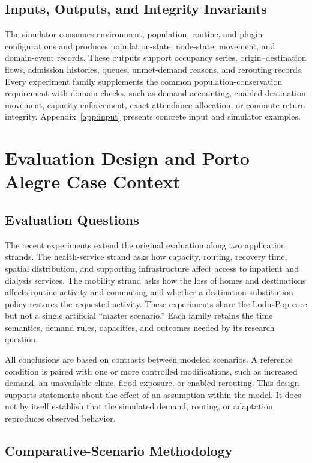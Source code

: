 \documentclass[pdflatex,sn-mathphys-num]{sn-jnl}%
\theoremstyle{thmstyleone}%
\theoremstyle{thmstyletwo}%
\theoremstyle{thmstylethree}%
\begin{document}
\subsection{Inputs, Outputs, and Integrity Invariants}

The simulator consumes environment, population, routine, and plugin configurations and produces population-state, node-state, movement, and domain-event records. These outputs support occupancy series, origin--destination flows, admission histories, queues, unmet-demand reasons, and rerouting records. Every experiment family supplements the common population-conservation requirement with domain checks, such as demand accounting, enabled-destination movement, capacity enforcement, exact attendance allocation, or commute-return integrity. Appendix~\ref{app:input} presents concrete input and simulator examples.

\section{Evaluation Design and Porto Alegre Case Context}
\label{sec:extended_evaluation}

\subsection{Evaluation Questions}
The recent experiments extend the original evaluation along two application strands. The health-service strand asks how capacity, routing, recovery time, spatial distribution, and supporting infrastructure affect access to inpatient and dialysis services. The mobility strand asks how the loss of homes and destinations affects routine activity and commuting and whether a destination-substitution policy restores the requested activity. These experiments share the LodusPop core but not a single artificial ``master scenario.'' Each family retains the time semantics, demand rules, capacities, and outcomes needed by its research question.

All conclusions are based on contrasts between modeled scenarios. A reference condition is paired with one or more controlled modifications, such as increased demand, an unavailable clinic, flood exposure, or enabled rerouting. This design supports statements about the effect of an assumption within the model. It does not by itself establish that the simulated demand, routing, or adaptation reproduces observed behavior.



\subsection{Comparative-Scenario Methodology}
\end{document}
